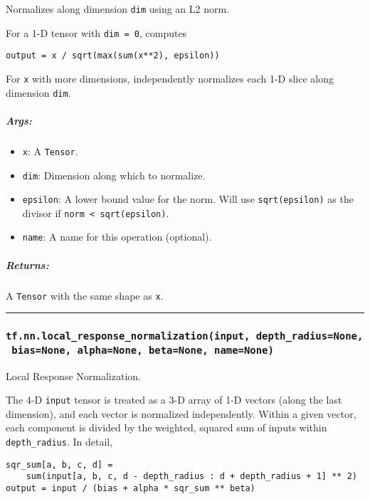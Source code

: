 Normalizes along dimension \texttt{dim} using an L2 norm.

For a 1-D tensor with \texttt{dim\ =\ 0}, computes

\begin{verbatim}
output = x / sqrt(max(sum(x**2), epsilon))
\end{verbatim}

For \texttt{x} with more dimensions, independently normalizes each 1-D
slice along dimension \texttt{dim}.

\subparagraph{Args: }\label{args-13}

\begin{itemize}
\tightlist
\item
  \texttt{x}: A \texttt{Tensor}.
\item
  \texttt{dim}: Dimension along which to normalize.
\item
  \texttt{epsilon}: A lower bound value for the norm. Will use
  \texttt{sqrt(epsilon)} as the divisor if
  \texttt{norm\ \textless{}\ sqrt(epsilon)}.
\item
  \texttt{name}: A name for this operation (optional).
\end{itemize}

\subparagraph{Returns: }\label{returns-13}

A \texttt{Tensor} with the same shape as \texttt{x}.

\begin{center}\rule{0.5\linewidth}{\linethickness}\end{center}

\subsubsection{\texorpdfstring{\texttt{tf.nn.local\_response\_normalization(input,\ depth\_radius=None,\ bias=None,\ alpha=None,\ beta=None,\ name=None)}
}{tf.nn.local\_response\_normalization(input, depth\_radius=None, bias=None, alpha=None, beta=None, name=None) }}\label{tf.nn.localux5fresponseux5fnormalizationinput-depthux5fradiusnone-biasnone-alphanone-betanone-namenone}

Local Response Normalization.

The 4-D \texttt{input} tensor is treated as a 3-D array of 1-D vectors
(along the last dimension), and each vector is normalized independently.
Within a given vector, each component is divided by the weighted,
squared sum of inputs within \texttt{depth\_radius}. In detail,

\begin{verbatim}
sqr_sum[a, b, c, d] =
    sum(input[a, b, c, d - depth_radius : d + depth_radius + 1] ** 2)
output = input / (bias + alpha * sqr_sum ** beta)
\end{verbatim}

